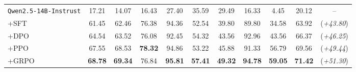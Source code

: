 \begin{table}[t]
{\begin{tabular}{l | c c c| c c| c c| c | c c }
\midrule
\rowcolor{Gray!16} \texttt{Qwen2.5-14B-Instrust} & 17.21 & 14.07& 16.43& 27.40& 35.59& 29.49& 16.33& 4.45& 20.12 & --\\
\quad +SFT  & 61.45& 62.46& {76.38}& {94.36}& 52.54& 39.80& 89.80& 34.58 & 63.92 & \textcolor{OliveGreen}{(\emph{+43.80})} \\
\quad \quad +DPO  & {64.54} & {63.52} & 76.08 & 92.45 & {54.32} & {43.56} & {92.96}& {43.56} &{66.37} & \textcolor{OliveGreen}{(\emph{+46.25})}\\
\quad \quad +PPO  & 67.55 & 68.53 & \textbf{78.32} & 94.86 & 53.22 & 45.88 & 91.33 & 56.79 & 69.56  & \textcolor{OliveGreen}{(\emph{+49.44})}\\
\rowcolor{SeaGreen!16} \quad \quad +GRPO & \textbf{68.78} & \textbf{69.34} & {76.84} & \textbf{95.81} & \textbf{57.41} & \textbf{49.32} & \textbf{94.78} & \textbf{59.05} & \textbf{71.42} & \textcolor{OliveGreen}{(\emph{+51.30})}\\
\bottomrule
\end{tabular}%
}
\label{tab:training_results}
\end{table}
